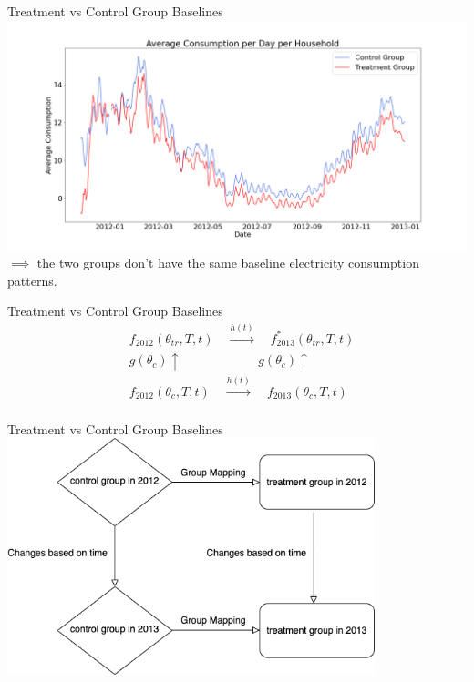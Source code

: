 \documentclass{beamer}
\begin{document}
\begin{frame}{Treatment vs Control Group Baselines}
  \centering
  \includegraphics[width=1\textwidth]{images/avg-consumption-per-day-baseline.png}
  $\implies$ the two groups don't have the same baseline electricity consumption patterns.
\end{frame}

\begin{frame}{Treatment vs Control Group Baselines}
  $$
  \begin{aligned}
    & f_{2012}\left(\theta_{t r}, T, t\right) \quad \stackrel{h(t)}{\longrightarrow} \quad f_{2013}^*\left(\theta_{t r}, T, t\right) \\
    & g\left(\theta_c\right) \uparrow \quad \quad \quad \quad \quad \quad g\left(\theta_c\right) \uparrow \\
    & f_{2012}\left(\theta_c, T, t\right) \quad \stackrel{h(t)}{\longrightarrow} \quad f_{2013}\left(\theta_c, T, t\right) \\
    &
  \end{aligned}
  $$
\end{frame}

\begin{frame}{Treatment vs Control Group Baselines}
  \centering
  \includegraphics[width=0.8\textwidth]{images/group-mapping.png}
\end{frame}
\end{document}
